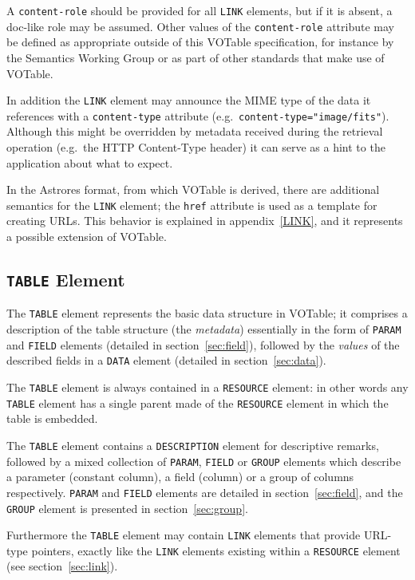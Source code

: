 \documentclass[11pt,a4paper]{ivoa}
\def\Aref#1{section~\ref{#1}}
\def\Arefx#1{appendix~\ref{#1}}
\let\fg=\color
\def\attr#1{{\tt{\fg{DarkRed}#1}}}
\def\elem#1{{\tt{\fg{DarkRed}#1}}}
\def\attrval#1#2{{\tt{\fg{DarkRed}#1}="{\fg{DarkPurple}#2}"}}
\begin{document}
A \attr{content-role} should be provided for all \elem{LINK} elements,
but if it is absent, a doc-like role may be assumed.
Other values of the \attr{content-role} attribute may be defined
as appropriate outside of this VOTable specification,
for instance by the Semantics Working Group or as part of other
standards that make use of VOTable.

In addition the \elem{LINK} element
may announce the MIME type of the data it references
with a \attr{content-type} attribute (e.g.\ \attrval{content-type}{image/fits}).
Although this might be overridden by metadata received during the
retrieval operation (e.g.\ the HTTP Content-Type header)
it can serve as a hint to the application about what to expect.

In the Astrores format, from which VOTable is derived,
there are additional semantics for the {\elem{LINK}}
element; the \elem{href} attribute is used as a template for creating
URLs. This behavior is explained in \Arefx{LINK},
and it represents
a possible extension of VOTable.

\subsection{\elem{TABLE} Element}
\label{elem:TABLE}

The \elem{TABLE} element represents the basic data structure in VOTable;
it comprises a description of the table structure (the {\em metadata})
essentially in the form of \elem{PARAM} and \elem{FIELD} elements
(detailed in \Aref{sec:field}),
followed by the {\em values} of the described fields in a \elem{DATA}
element (detailed in \Aref{sec:data}).

The \elem{TABLE} element is always contained in a \elem{RESOURCE} element:
in other words
any \elem{TABLE} element has a single parent made of the
\elem{RESOURCE} element
in which the table is embedded.

The \elem{TABLE} element contains
a {\elem{DESCRIPTION}} element for descriptive remarks, followed
by a mixed collection of \elem{PARAM}, \elem{FIELD} or \elem{GROUP} elements
which describe a parameter (constant column), a field (column) or a group of
columns respectively. \elem{PARAM} and \elem{FIELD} elements are detailed in
\Aref{sec:field}, and the \elem{GROUP} element
is presented in \Aref{sec:group}.

Furthermore the \elem{TABLE} element may contain {\elem{LINK}} elements
that provide URL-type pointers, exactly like the {\elem{LINK}} elements
existing within a \elem{RESOURCE} element (see \Aref{sec:link}).
\end{document}

